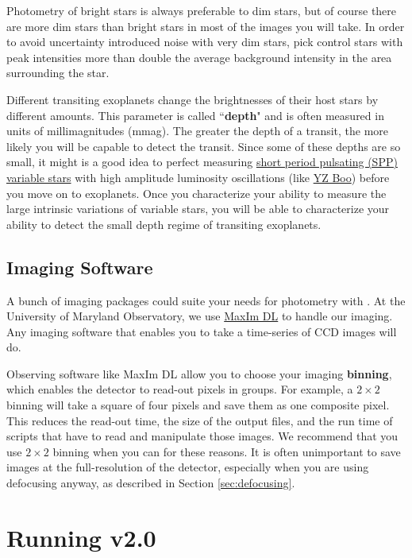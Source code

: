 \documentclass[a4paper]{article}
\begin{document}
Photometry of bright stars is always preferable to dim stars, but of course there are more dim stars than bright stars in most of the images you will take. In order to avoid uncertainty introduced noise with very dim stars, pick control stars with peak intensities more than double the average background intensity in the area surrounding the star. 

Different transiting exoplanets change the brightnesses of their host stars by different amounts. This parameter is called ``\textbf{depth}" and is often measured in units of millimagnitudes (mmag). The greater the depth of a transit, the more likely you will be capable to detect the transit. Since some of these depths are so small, it might is a good idea to perfect measuring \href{https://sites.google.com/site/aavsosppsection/}{short period pulsating (SPP) variable stars} with high amplitude luminosity oscillations (like \href{http://www.aavso.org/vsx/index.php?view=detail.top&oid=4356}{YZ Boo}) before you move on to exoplanets. Once you characterize your ability to measure the large intrinsic variations of variable stars, you will be able to characterize your ability to detect the small depth regime of transiting exoplanets. 

\subsection{Imaging Software}
A bunch of imaging packages could suite your needs for photometry with \oscaar. At the University of Maryland Observatory, we use \href{http://www.cyanogen.com/maxim_main.php}{MaxIm DL} to handle our imaging. Any imaging software that enables you to take a time-series of CCD images will do. 

Observing software like MaxIm DL allow you to choose your imaging \textbf{binning}, which enables the detector to read-out pixels in groups. For example, a $2\times2$ binning will take a square of four pixels and save them as one composite pixel. This reduces the read-out time, the size of the output files, and the run time of scripts that have to read and manipulate those images. We recommend that you use $2\times2$ binning when you can for these reasons. It is often unimportant to save images at the full-resolution of the detector, especially when you are using defocusing anyway, as described in Section \ref{sec:defocusing}. 

\section{Running \oscaar v2.0}
\end{document}
